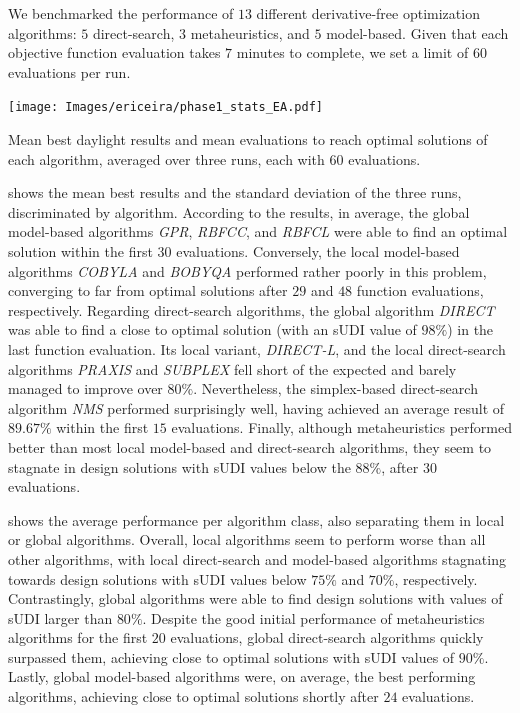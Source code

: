  We benchmarked the performance of $13$ different derivative-free optimization algorithms: $5$ direct-search, $3$ metaheuristics, and $5$ model-based. Given that each objective function evaluation takes $7$ minutes to complete, we set a limit of $60$ evaluations per run.

\begin{table}[]
	\centering
	\texttt{[image: Images/ericeira/phase1\_stats\_EA.pdf]}	
	\caption{Mean best daylight results and mean evaluations to reach optimal solutions of each algorithm, averaged over three runs, each with $60$ evaluations.}
	\label{table:phase1results}
\end{table}

 shows the mean best results and the standard deviation of the three runs, discriminated by algorithm. According to the results, in average, the global model-based algorithms \textit{GPR}, \textit{RBFCC}, and \textit{RBFCL} were able to find an optimal solution within the first $30$ evaluations. Conversely, the local model-based algorithms \textit{\ac{COBYLA}} and \textit{\ac{BOBYQA}} performed rather poorly in this problem, converging to far from optimal solutions after $29$ and $48$ function evaluations, respectively. Regarding direct-search algorithms, the global algorithm \textit{\ac{DIRECT}} was able to find a close to optimal solution (with an \ac{sUDI} value of $98\%$) in the last function evaluation. Its local variant, \textit{\ac{DIRECT}-L}, and the local direct-search algorithms \textit{\ac{PRAXIS}} and \textit{SUBPLEX} fell short of the expected and barely managed to improve over $80\%$. Nevertheless, the simplex-based direct-search algorithm \textit{\ac{NMS}} performed surprisingly well, having achieved an average result of $89.67\%$ within the first $15$ evaluations. Finally, although metaheuristics performed better than most local model-based and direct-search algorithms, they seem to stagnate in design solutions with \ac{sUDI} values below the $88\%$, after $30$ evaluations.

 shows the average performance per algorithm class, also separating them in local or global algorithms. Overall, local algorithms seem to perform worse than all other algorithms, with local direct-search and model-based algorithms stagnating towards design solutions with \ac{sUDI} values below $75\%$ and $70\%$, respectively. Contrastingly, global algorithms were able to find design solutions with values of \ac{sUDI} larger than $80\%$. Despite the good initial performance of metaheuristics algorithms for the first $20$ evaluations, global direct-search algorithms quickly surpassed them, achieving close to optimal solutions with \ac{sUDI} values of $90\%$. Lastly, global model-based algorithms were, on average, the best performing algorithms, achieving close to optimal solutions shortly after $24$ evaluations. 

